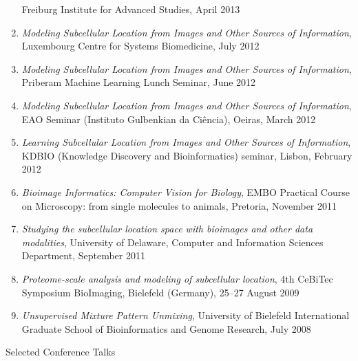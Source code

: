 \documentclass{article}
\renewcommand\subsection[1]{%
    \par\vspace{.1em}%
    {\hspace{0em}\subsubhead #1}%
    \par\vspace{.4em}%
}
\begin{document}
\begin{enumerate}
Freiburg Institute for Advanced Studies, April 2013
\item \emph{Modeling Subcellular Location from Images and Other Sources of
Information}, Luxembourg Centre for Systems Biomedicine, July 2012
\item \emph{Modeling Subcellular Location from Images and Other Sources of
Information}, Priberam Machine Learning Lunch Seminar, June 2012
\item \emph{Modeling Subcellular Location from Images and Other Sources of
Information}, EAO Seminar (Instituto Gulbenkian da Ciência), Oeiras, March 2012
\item \emph{Learning Subcellular Location from Images and Other Sources of
Information}, KDBIO (Knowledge Discovery and Bioinformatics) seminar, Lisbon,
February 2012
\item \emph{Bioimage Informatics: Computer Vision for Biology}, EMBO Practical
Course on Microscopy: from single molecules to animals, Pretoria, November 2011
\item \emph{Studying the subcellular location space with bioimages and other
data modalities}, University of Delaware, Computer and Information Sciences
Department, September 2011
\item \emph{Proteome-scale analysis and modeling of subcellular location}, 4th
CeBiTec Symposium BioImaging, Bielefeld (Germany), 25--27 August 2009
\item \emph{Unsupervised Mixture Pattern Unmixing}, University of Bielefeld
International Graduate School of Bioinformatics and Genome Research, July 2008
\end{enumerate}

\subsection{Selected Conference Talks}
\end{document}

